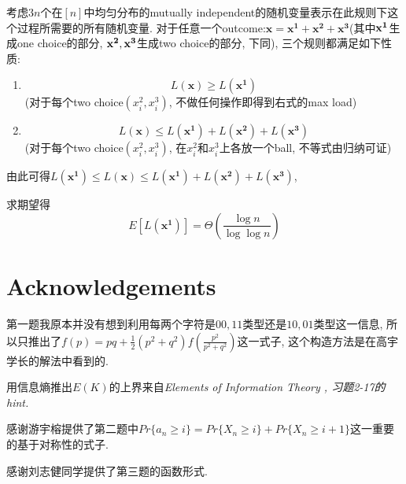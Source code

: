 \documentclass[paper=a4, fontsize=11pt]{scrartcl} %
\numberwithin{equation}{section} %
\numberwithin{figure}{section} %
\numberwithin{table}{section} %
\begin{document}
考虑$3n$个在$[n]$中均匀分布的mutually independent的随机变量表示在此规则下这个过程所需要的所有随机变量.
对于任意一个outcome:$\mathbf{x} = \mathbf{x^1} + \mathbf{x^2} + \mathbf{x^3}$(其中$\bf{x^1}$生成one choice的部分, $\bf{x^2}, \bf{x^3}$生成two choice的部分, 下同), 
三个规则都满足如下性质:
\begin{enumerate}
		\item $$L(\mathbf{x}) \geq L(\mathbf{x^1})$$
		(对于每个two choice$(x^2_i, x^3_i)$, 不做任何操作即得到右式的max load)
		\item $$L(\mathbf{x}) \leq L(\mathbf{x^1}) + L(\mathbf{x^2}) + L(\mathbf{x^3})$$
		(对于每个two choice$(x^2_i, x^3_i)$, 在$x^2_i$和$x^3_i$上各放一个ball, 不等式由归纳可证)
\end{enumerate}

由此可得$L(\mathbf{x^1}) \leq L(\mathbf{x}) \leq L(\mathbf{x^1}) + L(\mathbf{x^2}) + L(\mathbf{x^3})$,

求期望得$$E[L(\mathbf{x^1})] = \Theta\left(\frac{\log n}{\log\log n}\right)$$
\section*{Acknowledgements}
第一题我原本并没有想到利用每两个字符是$00,11$类型还是$10, 01$类型这一信息, 所以只推出了$f(p) = pq + \frac{1}{2}\left(p^2 + q^2\right)f\left(\frac{p^2}{p^2 + q^2}\right)$这一式子, 这个构造方法是在高宇学长的解法中看到的.

用信息熵推出$E(K)$的上界来自\it{Elements of Information Theory} \rm, 习题2-17的hint.

感谢游宇榕提供了第二题中$Pr\{a_n\geq i\} = Pr\{X_n\geq i\} + Pr\{X_n\geq i + 1\}$这一重要的基于对称性的式子.

感谢刘志健同学提供了第三题的函数形式.
\end{document}

